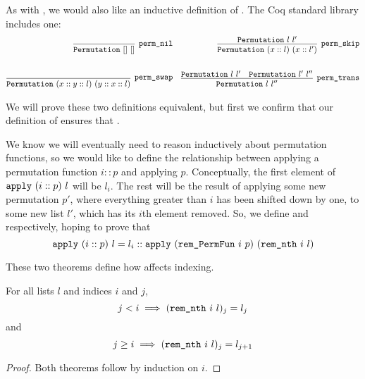 \documentclass[11pt]{thesis}
\begin{document}
As with , we would also like an inductive definition of
. The Coq standard library includes one:
\begin{align*}
  \infer[\var{perm\_nil}]{\var{Permutation}~[]~[]}{}
  &&
  \infer[\var{perm\_skip}]{\var{Permutation}~(x :: l)~(x :: l')}{%
    \var{Permutation}~l~l'
  }
  \\
  \\
  \infer[\var{perm\_swap}]{\var{Permutation}~(x :: y :: l)~(y :: x :: l)}{}
  &&
  \infer[\var{perm\_trans}]{\var{Permutation}~l~l''}{
    \var{Permutation}~l~l' & \var{Permutation}~l'~l''
  }
\end{align*}

We will prove these two definitions equivalent, but first we confirm that our definition of  ensures that .

We know we will
eventually need to reason inductively about permutation functions, so
we would like to define the relationship between applying a
permutation function $i :: p$ and applying $p$. Conceptually, the
first element of $\texttt{apply}~(i::p)~l$ will be $l_i$. The rest will
be the result of applying some new permutation $p'$, where everything
greater than $i$ has been shifted down by one, to some new list $l'$,
which has its $i$th element removed. So, we define 
and  respectively, hoping to prove that
\begin{equation*}
  \texttt{apply}~(i::p)~l =
  l_i :: \texttt{apply}~(\texttt{rem\_PermFun}~i~p)~(\texttt{rem\_nth}~i~l)
\end{equation*}

\vspace{\parskip}


These two theorems define how  affects indexing.
\begin{theorem}
  For all lists $l$ and indices $i$ and $j$,
  \begin{equation*}
    j < i \implies (\texttt{rem\_nth}~i~l)_j = l_j
  \end{equation*}
  and
  \begin{equation*}
    j \ge i \implies (\texttt{rem\_nth}~i~l)_j = l_{j+1}
  \end{equation*}
\end{theorem}
\begin{proof}
  Both theorems follow by induction on $i$.
\end{proof}
\end{document}
